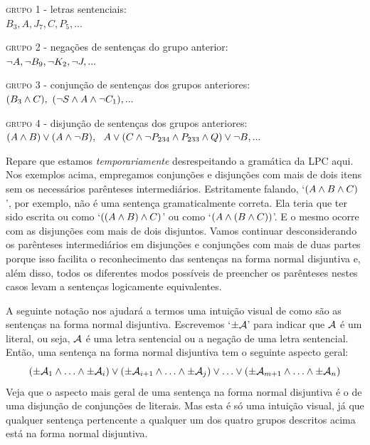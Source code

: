 \begin{earg}
		\item[\textsc{grupo 1} - letras sentenciais:] \ \\
				$B_3, A, J_7, C, P_5,...$
		\item[\textsc{grupo 2} - negações de sentenças do grupo anterior:] \ \\
				$\neg A, \neg B_9, \neg K_2, \neg J,... $
		\item[\textsc{grupo 3} - conjunção de sentenças dos grupos anteriores:] \ \\
				$(B_3 \wedge C), \ (\neg S \wedge A \wedge \neg C_1),...$
		\item[\textsc{grupo 4} - disjunção de sentenças dos grupos anteriores:] \ \\ 
				$(A \wedge B) \vee (A \wedge \neg B),\ \  A \vee (C \wedge \neg P_{234} \wedge P_{233} \wedge Q) \vee \neg B,...$
	\end{earg}
Repare que estamos \emph{temporariamente} desrespeitando a gramática da LPC aqui. 
Nos exemplos acima, empregamos conjunções e disjunções com mais de dois itens sem os necessários parênteses intermediários.
Estritamente falando, `$(A \wedge B \wedge C)$', por exemplo, não é uma sentença gramaticalmente correta. Ela teria que ter sido escrita ou como `$((A \wedge B) \wedge C)$' ou como `$(A \wedge (B \wedge C))$'. 
E o mesmo ocorre com as disjunções com mais de dois disjuntos.
Vamos continuar desconsiderando os parênteses intermediários em disjunções e conjunções com mais de duas partes porque isso facilita o reconhecimento das sentenças na forma normal disjuntiva e, além disso, todos os diferentes modos possíveis de preencher os parênteses nestes casos levam a sentenças logicamente equivalentes.

A seguinte notação nos ajudará a termos uma intuição visual de como são as sentenças na forma normal disjuntiva.
Escrevemos `$\pm \mathcal{A}$' para indicar que $\mathcal{A}$ é um literal, ou seja, $\mathcal{A}$ é uma letra sentencial ou a negação de uma letra sentencial.
Então, uma sentença na forma normal disjuntiva tem o seguinte aspecto geral:
	$$(\pm \mathcal{A}_1 \land \ldots \land \pm \mathcal{A}_i) \lor (\pm \mathcal{A}_{i+1} \land \ldots \land \pm\mathcal{A}_j) \lor \ldots \lor (\pm\mathcal{A}_{m+1} \land \ldots \land \pm \mathcal{A}_n)$$
Veja que o aspecto mais geral de uma sentença na forma normal disjuntiva é o de uma disjunção de conjunções de literais.
Mas esta é só uma intuição visual, já que qualquer sentença pertencente a  qualquer um dos quatro grupos descritos acima está na forma normal disjuntiva.


